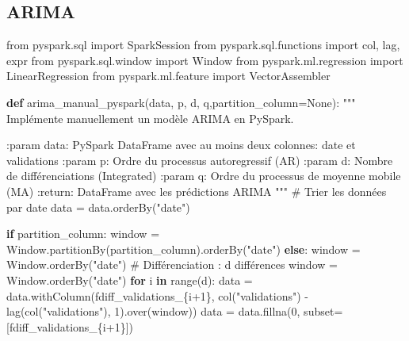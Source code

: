 \documentclass[
  letterpaper,
  DIV=11,
  numbers=noendperiod]{scrartcl}
\newenvironment{Shaded}{\begin{snugshade}}{\end{snugshade}}
\newcommand{\BuiltInTok}[1]{\textcolor[rgb]{0.00,0.23,0.31}{#1}}
\newcommand{\CommentTok}[1]{\textcolor[rgb]{0.37,0.37,0.37}{#1}}
\newcommand{\ControlFlowTok}[1]{\textcolor[rgb]{0.00,0.23,0.31}{\textbf{#1}}}
\newcommand{\DecValTok}[1]{\textcolor[rgb]{0.68,0.00,0.00}{#1}}
\newcommand{\ImportTok}[1]{\textcolor[rgb]{0.00,0.46,0.62}{#1}}
\newcommand{\KeywordTok}[1]{\textcolor[rgb]{0.00,0.23,0.31}{\textbf{#1}}}
\newcommand{\NormalTok}[1]{\textcolor[rgb]{0.00,0.23,0.31}{#1}}
\newcommand{\OperatorTok}[1]{\textcolor[rgb]{0.37,0.37,0.37}{#1}}
\newcommand{\SpecialCharTok}[1]{\textcolor[rgb]{0.37,0.37,0.37}{#1}}
\newcommand{\SpecialStringTok}[1]{\textcolor[rgb]{0.13,0.47,0.30}{#1}}
\newcommand{\StringTok}[1]{\textcolor[rgb]{0.13,0.47,0.30}{#1}}
\newcommand{\VariableTok}[1]{\textcolor[rgb]{0.07,0.07,0.07}{#1}}
\begin{document}
\subsection{ARIMA}\label{arima}

\begin{Shaded}
\begin{Highlighting}[]
\ImportTok{from}\NormalTok{ pyspark.sql }\ImportTok{import}\NormalTok{ SparkSession}
\ImportTok{from}\NormalTok{ pyspark.sql.functions }\ImportTok{import}\NormalTok{ col, lag, expr}
\ImportTok{from}\NormalTok{ pyspark.sql.window }\ImportTok{import}\NormalTok{ Window}
\ImportTok{from}\NormalTok{ pyspark.ml.regression }\ImportTok{import}\NormalTok{ LinearRegression}
\ImportTok{from}\NormalTok{ pyspark.ml.feature }\ImportTok{import}\NormalTok{ VectorAssembler}

\KeywordTok{def}\NormalTok{ arima\_manual\_pyspark(data, p, d, q,partition\_column}\OperatorTok{=}\VariableTok{None}\NormalTok{):}
    \CommentTok{"""}
\CommentTok{    Implémente manuellement un modèle ARIMA en PySpark.}

\CommentTok{    :param data: PySpark DataFrame avec au moins deux colonnes: \textquotesingle{}date\textquotesingle{} et \textquotesingle{}validations\textquotesingle{}}
\CommentTok{    :param p: Ordre du processus autoregressif (AR)}
\CommentTok{    :param d: Nombre de différenciations (Integrated)}
\CommentTok{    :param q: Ordre du processus de moyenne mobile (MA)}
\CommentTok{    :return: DataFrame avec les prédictions ARIMA}
\CommentTok{    """}
    \CommentTok{\# Trier les données par date}
\NormalTok{    data }\OperatorTok{=}\NormalTok{ data.orderBy(}\StringTok{"date"}\NormalTok{)}

    \ControlFlowTok{if}\NormalTok{ partition\_column:}
\NormalTok{        window }\OperatorTok{=}\NormalTok{ Window.partitionBy(partition\_column).orderBy(}\StringTok{"date"}\NormalTok{)}
    \ControlFlowTok{else}\NormalTok{:}
\NormalTok{        window }\OperatorTok{=}\NormalTok{ Window.orderBy(}\StringTok{"date"}\NormalTok{)}
    \CommentTok{\# Différenciation : d différences}
\NormalTok{    window }\OperatorTok{=}\NormalTok{ Window.orderBy(}\StringTok{"date"}\NormalTok{)}
    \ControlFlowTok{for}\NormalTok{ i }\KeywordTok{in} \BuiltInTok{range}\NormalTok{(d):}
\NormalTok{        data }\OperatorTok{=}\NormalTok{ data.withColumn(}\SpecialStringTok{f\textquotesingle{}diff\_validations\_}\SpecialCharTok{\{}\NormalTok{i}\OperatorTok{+}\DecValTok{1}\SpecialCharTok{\}}\SpecialStringTok{\textquotesingle{}}\NormalTok{, col(}\StringTok{"validations"}\NormalTok{) }\OperatorTok{{-}}\NormalTok{ lag(col(}\StringTok{"validations"}\NormalTok{), }\DecValTok{1}\NormalTok{).over(window))}
\NormalTok{        data }\OperatorTok{=}\NormalTok{ data.fillna(}\DecValTok{0}\NormalTok{, subset}\OperatorTok{=}\NormalTok{[}\SpecialStringTok{f\textquotesingle{}diff\_validations\_}\SpecialCharTok{\{}\NormalTok{i}\OperatorTok{+}\DecValTok{1}\SpecialCharTok{\}}\SpecialStringTok{\textquotesingle{}}\NormalTok{])}
    

\end{Highlighting}
\end{Shaded}
\end{document}
